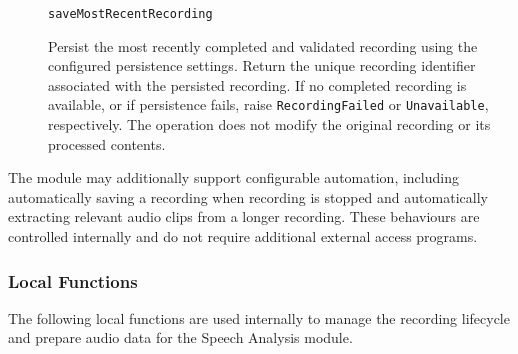 \documentclass[12pt, titlepage]{article}
\begin{document}
\begin{description}
\item[] \texttt{saveMostRecentRecording}\par
Persist the most recently completed and validated recording using the configured persistence settings. Return the unique recording identifier associated with the persisted recording. If no completed recording is available, or if persistence fails, raise \texttt{RecordingFailed} or \texttt{Unavailable}, respectively. The operation does not modify the original recording or its processed contents.

\end{description}

The module may additionally support configurable automation, including automatically saving a recording when recording is stopped and automatically extracting relevant audio clips from a longer recording. These behaviours are controlled internally and do not require additional external access programs.

\subsubsection{Local Functions}

The following local functions are used internally to manage the recording lifecycle and prepare audio data for the Speech Analysis module.
\end{document}
